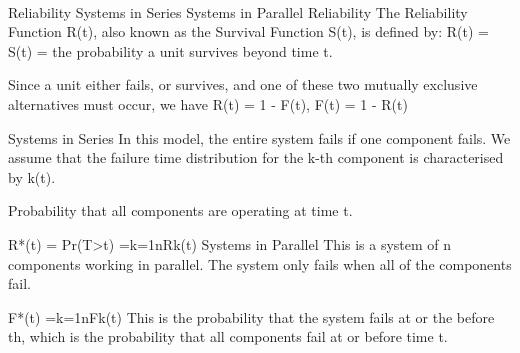  


Reliability
Systems in Series
Systems in Parallel
Reliability
The Reliability Function R(t), also known as the Survival Function S(t), is defined by:  R(t) = S(t) = the probability a unit survives beyond
time t.
 
Since a unit either fails, or survives, and one of these two mutually exclusive alternatives must occur, we have  R(t) = 1 - F(t),   F(t) = 1 - R(t)

Systems in Series
In this model, the entire system fails if one component fails.  We assume that the failure time distribution for the k-th  component is characterised by k(t).
 
Probability that all components are operating at time t.
 
R*(t) = Pr(T>t) =k=1nRk(t)
Systems in Parallel
This is a system of n components working in parallel. The system only fails when all of the components fail.
 
F*(t) =k=1nFk(t)
This is the probability that the system fails at or the before th, which is the probability that all components fail at or before time t.
 

 


